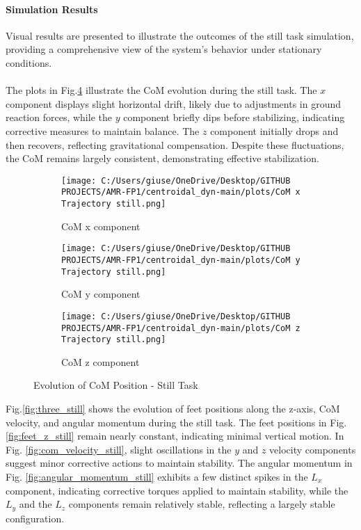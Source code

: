 \documentclass[main.tex]{subfiles}
\begin{document}
\begin{sloppypar}
\paragraph{Simulation Results}
Visual results are presented to illustrate the outcomes of the still task simulation, providing a comprehensive view of the system’s behavior under stationary conditions.\\
\\
The plots in Fig.\ref{fig:com_still} illustrate the CoM evolution during the still task. The \( x \) component displays slight horizontal drift, likely due to adjustments in ground reaction forces, while the \( y \) component briefly dips before stabilizing, indicating corrective measures to maintain balance. The \( z \) component initially drops and then recovers, reflecting gravitational compensation. Despite these fluctuations, the CoM remains largely consistent, demonstrating effective stabilization. \\
\begin{figure}[H]
    \centering
    \begin{subfigure}[b]{0.32\textwidth}
        \centering
        \texttt{[image: C:/Users/giuse/OneDrive/Desktop/GITHUB PROJECTS/AMR-FP1/centroidal\_dyn-main/plots/CoM x Trajectory still.png]}
        \caption{CoM x component}
        \label{fig:com_x_still}
    \end{subfigure}
    \hfill
    \begin{subfigure}[b]{0.32\textwidth}
        \centering
        \texttt{[image: C:/Users/giuse/OneDrive/Desktop/GITHUB PROJECTS/AMR-FP1/centroidal\_dyn-main/plots/CoM y Trajectory still.png]}
        \caption{CoM y component}
        \label{fig:com_y_still}
    \end{subfigure}
    \hfill
    \begin{subfigure}[b]{0.32\textwidth}
        \centering
        \texttt{[image: C:/Users/giuse/OneDrive/Desktop/GITHUB PROJECTS/AMR-FP1/centroidal\_dyn-main/plots/CoM z Trajectory still.png]}
        \caption{CoM z component}
        \label{fig:com_z_still}
    \end{subfigure}
    \caption{Evolution of CoM Position - Still Task}
    \label{fig:com_still}
\end{figure}
Fig.\ref{fig:three_still} shows the evolution of feet positions along the z-axis, CoM velocity, and angular momentum during the still task. The feet positions in Fig. \ref{fig:feet_z_still} remain nearly constant, indicating minimal vertical motion. In Fig. \ref{fig:com_velocity_still}, slight oscillations in the $y$ and $z$ velocity components suggest minor corrective actions to maintain stability. The angular momentum in Fig. \ref{fig:angular_momentum_still} exhibits a few distinct spikes in the $L_x$ component, indicating corrective torques applied to maintain stability, while the $L_y$ and the $L_z$ components remain relatively stable, reflecting a largely stable configuration. \\

\end{sloppypar}
\end{document}
